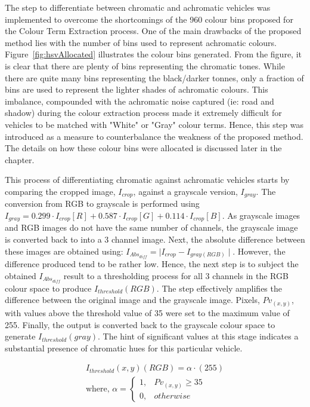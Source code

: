 The step to differentiate between chromatic and achromatic vehicles was implemented to overcome the shortcomings of the 960 colour bins proposed for the Colour Term Extraction process.
One of the main drawbacks of the proposed method lies with the number of bins used to represent achromatic colours.
Figure~\ref{fig:hsvAllocated} illustrates the colour bins generated. From the figure, it is clear that there are plenty of bins representing the chromatic tones.
While there are quite many bins representing the black/darker tonnes, only a fraction of bins are used to represent the lighter shades of achromatic colours.
This imbalance, compounded with the achromatic noise captured (ie: road and shadow) during the colour extraction process made it extremely difficult for vehicles to be matched with "White" or "Gray" colour terms. Hence, this step was introduced as a measure to counterbalance the weakness of the proposed method.
The details on how these colour bins were allocated is discussed later in the chapter.

This process of differentiating chromatic against achromatic vehicles starts by comparing the cropped image, $I_{crop}$, against a grayscale version, $I_{gray}$.
The conversion from RGB to grayscale is performed using $I_{gray} = 0.299 \cdot I_{crop}[R]+0.587 \cdot I_{crop}[G]+0.114 \cdot I_{crop}[B]$.
As grayscale images and RGB images do not have the same number of channels, the grayscale image is converted back to into a 3 channel image.
Next, the absolute difference between these images are obtained using: $I_{Abs_{diff}} = \mid I_{crop} - I_{gray(RGB)} \mid$.
However, the difference produced tend to be rather low.
Hence, the next step is to subject the obtained $I_{Abs_{diff}}$ result to a thresholding process for all 3 channels in the RGB colour space to produce $I_{threshold}(RGB)$.
The step effectively amplifies the difference between the original image and the grayscale image. Pixels, $Pv_{(x,y)}$, with values above the threshold value of 35 were set to the maximum value of 255.
Finally, the output %
is converted back to the grayscale colour space to generate $I_{threshold}(gray)$. The hint of significant values at this stage indicates a substantial presence of chromatic hues for this particular vehicle.

\begin{align*}
\label{eq:threshabsolutediff}
I_{threshold}(x,y)(RGB) = \alpha \cdot (255) \\
\text{where, }
\alpha =
\begin{cases}
1, & Pv_{(x,y)} \geq 35\\
0, & otherwise
\end{cases}
\end{align*}



